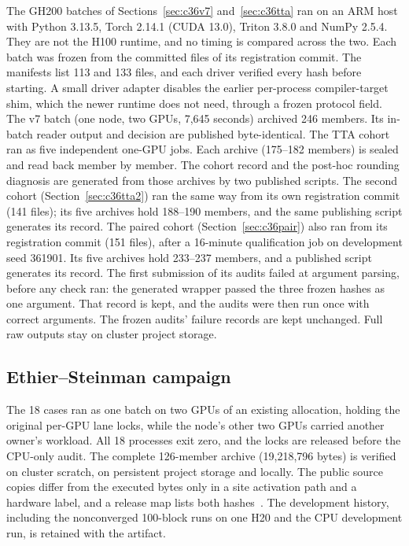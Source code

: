 \documentclass[11pt]{article}
\begin{document}
The GH200 batches of Sections~\ref{sec:c36v7} and~\ref{sec:c36tta} ran on
an ARM host with Python 3.13.5, Torch 2.14.1 (CUDA 13.0), Triton 3.8.0 and
NumPy 2.5.4. They are not the H100 runtime, and no timing is compared
across the two. Each batch was frozen from the committed files of
its registration commit. The manifests list 113 and 133 files, and each driver
verified every hash before starting. A small driver adapter disables the
earlier per-process compiler-target shim, which the newer runtime does not
need, through a frozen protocol field. The v7 batch (one node, two GPUs,
7,645 seconds) archived 246 members. Its in-batch reader output and
decision are published byte-identical. The TTA cohort ran as five
independent one-GPU jobs. Each archive (175--182 members) is sealed and
read back member by member. The cohort record and the post-hoc rounding
diagnosis are generated from those archives by two published scripts.
The second cohort (Section~\ref{sec:c36tta2}) ran the same way from its
own registration commit (141 files); its five archives hold 188--190
members, and the same publishing script generates its record. The paired
cohort (Section~\ref{sec:c36pair}) also ran from its registration commit
(151 files), after a 16-minute qualification job on development seed
361901. Its five archives hold 233--237 members, and a published script
generates its record. The first submission of its audits failed at argument
parsing, before any check ran: the generated wrapper passed the three
frozen hashes as one argument. That record is kept, and the audits were then run once with
correct arguments.
The frozen audits' failure records are kept unchanged. Full raw outputs
stay on cluster project storage.

\subsection{Ethier--Steinman campaign}
The 18 cases ran as one batch on two GPUs of an existing allocation,
holding the original per-GPU lane locks, while the node's other two GPUs
carried another owner's workload. All 18 processes exit zero, and the locks
are released before the CPU-only audit. The complete 126-member archive
(19,218,796 bytes) is verified on cluster scratch, on persistent project
storage and locally. The public source copies differ from the executed
bytes only in a site activation path and a hardware label, and a release
map lists both hashes~\cite{flashnsethier}. The development history,
including the nonconverged 100-block runs on one H20 and the CPU
development run, is retained with the artifact.
\end{document}
